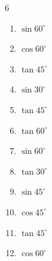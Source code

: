 \begin{multicols}{6}
\begin{enumerate}
  \item $\displaystyle \sin{60^\circ}$


\columnbreak %

\resetques

  \item $\displaystyle \cos{60^\circ}$


  \item $\displaystyle \tan{45^\circ}$

        \phantom{$\displaystyle =1$}

  \item $\displaystyle \sin{30^\circ}$


  \item $\displaystyle \tan{45^\circ}$

        \phantom{$\displaystyle =1$}

  \item $\displaystyle \tan{60^\circ}$


  \item $\displaystyle \sin{60^\circ}$


  \item $\displaystyle \tan{30^\circ}$


  \item $\displaystyle \sin{45^\circ}$


  \item $\displaystyle \cos{45^\circ}$


  \item $\displaystyle \tan{45^\circ}$

        \phantom{$\displaystyle =1$}

  \item $\displaystyle \cos{60^\circ}$



\end{enumerate}
\end{multicols}
